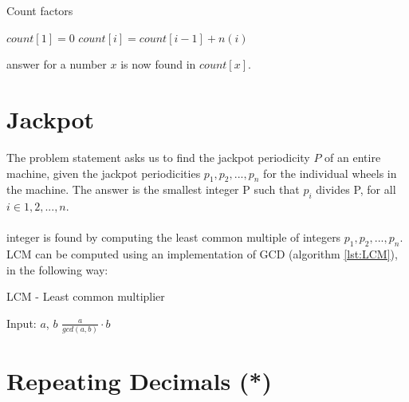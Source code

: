 \documentclass[11pt,a4paper,twoside]{article}
\begin{document}

\begin{algorithm}
    \caption{Count factors}
    \label{factorcount}
    \begin{algorithmic}
        \STATE $count[1] = 0$
            \STATE $count[i] = count[i-1] + n(i)$
        \ENDFOR
    \end{algorithmic}
\end{algorithm}

 answer for a number $x$ is now found in $count[x]$.


\section{Jackpot}

The problem statement asks us to find the jackpot periodicity $P$ of an entire
machine, given the jackpot periodicities $p_{1},p_{2},...,p_{n}$ for the
individual wheels in the machine. The answer is the smallest integer P such
that $p_{i}$ divides P, for all $i \in {1,2,...,n}$.
\\\\
 integer is found by computing the least common multiple of
integers $p_{1},p_{2},...,p_{n}$. LCM can be computed using an implementation
of GCD (algorithm \ref{lst:LCM}), in the following way:

\begin{algorithm}
    \caption{LCM - Least common multiplier}
    \label{lst:LCM}
    \begin{algorithmic}
        \REQUIRE Input: $a$, $b$
        \RETURN $ \frac{a}{gcd(a, b)} \cdot b$
    \end{algorithmic}
\end{algorithm}


\section{Repeating Decimals (*)}
\end{document}
